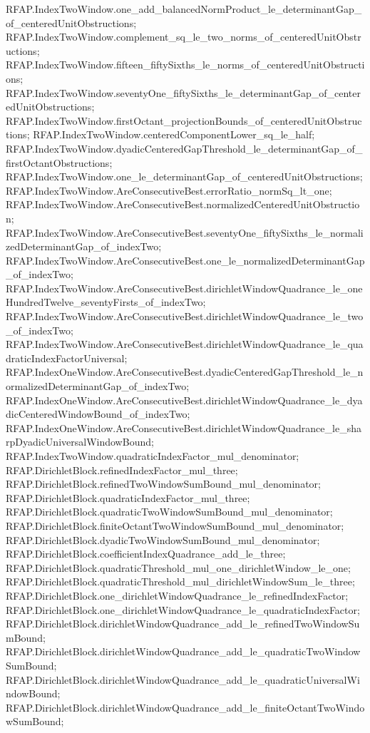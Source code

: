 \documentclass[11pt]{article}
\begin{document}
{RFAP.IndexTwoWindow.one_add_balancedNormProduct_le_determinantGap_of_centeredUnitObstructions;
RFAP.IndexTwoWindow.complement_sq_le_two_norms_of_centeredUnitObstructions;
RFAP.IndexTwoWindow.fifteen_fiftySixths_le_norms_of_centeredUnitObstructions;
RFAP.IndexTwoWindow.seventyOne_fiftySixths_le_determinantGap_of_centeredUnitObstructions;
RFAP.IndexTwoWindow.firstOctant_projectionBounds_of_centeredUnitObstructions;
RFAP.IndexTwoWindow.centeredComponentLower_sq_le_half;
RFAP.IndexTwoWindow.dyadicCenteredGapThreshold_le_determinantGap_of_firstOctantObstructions;
RFAP.IndexTwoWindow.one_le_determinantGap_of_centeredUnitObstructions;
RFAP.IndexTwoWindow.AreConsecutiveBest.errorRatio_normSq_lt_one;
RFAP.IndexTwoWindow.AreConsecutiveBest.normalizedCenteredUnitObstruction;
RFAP.IndexTwoWindow.AreConsecutiveBest.seventyOne_fiftySixths_le_normalizedDeterminantGap_of_indexTwo;
RFAP.IndexTwoWindow.AreConsecutiveBest.one_le_normalizedDeterminantGap_of_indexTwo;
RFAP.IndexTwoWindow.AreConsecutiveBest.dirichletWindowQuadrance_le_oneHundredTwelve_seventyFirsts_of_indexTwo;
RFAP.IndexTwoWindow.AreConsecutiveBest.dirichletWindowQuadrance_le_two_of_indexTwo;
RFAP.IndexTwoWindow.AreConsecutiveBest.dirichletWindowQuadrance_le_quadraticIndexFactorUniversal;
RFAP.IndexOneWindow.AreConsecutiveBest.dyadicCenteredGapThreshold_le_normalizedDeterminantGap_of_indexTwo;
RFAP.IndexOneWindow.AreConsecutiveBest.dirichletWindowQuadrance_le_dyadicCenteredWindowBound_of_indexTwo;
RFAP.IndexOneWindow.AreConsecutiveBest.dirichletWindowQuadrance_le_sharpDyadicUniversalWindowBound;
RFAP.IndexTwoWindow.quadraticIndexFactor_mul_denominator;
RFAP.DirichletBlock.refinedIndexFactor_mul_three;
RFAP.DirichletBlock.refinedTwoWindowSumBound_mul_denominator;
RFAP.DirichletBlock.quadraticIndexFactor_mul_three;
RFAP.DirichletBlock.quadraticTwoWindowSumBound_mul_denominator;
RFAP.DirichletBlock.finiteOctantTwoWindowSumBound_mul_denominator;
RFAP.DirichletBlock.dyadicTwoWindowSumBound_mul_denominator;
RFAP.DirichletBlock.coefficientIndexQuadrance_add_le_three;
RFAP.DirichletBlock.quadraticThreshold_mul_one_dirichletWindow_le_one;
RFAP.DirichletBlock.quadraticThreshold_mul_dirichletWindowSum_le_three;
RFAP.DirichletBlock.one_dirichletWindowQuadrance_le_refinedIndexFactor;
RFAP.DirichletBlock.one_dirichletWindowQuadrance_le_quadraticIndexFactor;
RFAP.DirichletBlock.dirichletWindowQuadrance_add_le_refinedTwoWindowSumBound;
RFAP.DirichletBlock.dirichletWindowQuadrance_add_le_quadraticTwoWindowSumBound;
RFAP.DirichletBlock.dirichletWindowQuadrance_add_le_quadraticUniversalWindowBound;
RFAP.DirichletBlock.dirichletWindowQuadrance_add_le_finiteOctantTwoWindowSumBound;
}
\end{document}
